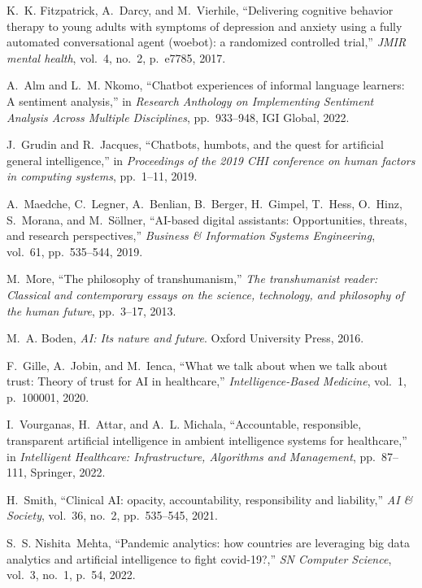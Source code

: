 \documentclass{article}
\begin{document}
\begin{thebibliography}{100}
	K.~K. Fitzpatrick, A.~Darcy, and M.~Vierhile, ``Delivering cognitive behavior
	therapy to young adults with symptoms of depression and anxiety using a fully
	automated conversational agent (woebot): a randomized controlled trial,''
	{\em JMIR mental health}, vol.~4, no.~2, p.~e7785, 2017.
	
	A.~Alm and L.~M. Nkomo, ``Chatbot experiences of informal language learners: A
	sentiment analysis,'' in {\em Research Anthology on Implementing Sentiment
		Analysis Across Multiple Disciplines}, pp.~933--948, IGI Global, 2022.
	
	J.~Grudin and R.~Jacques, ``Chatbots, {h}umbots, and the quest for artificial
	general intelligence,'' in {\em Proceedings of the 2019 CHI conference on
		human factors in computing systems}, pp.~1--11, 2019.
	
	A.~Maedche, C.~Legner, A.~Benlian, B.~Berger, H.~Gimpel, T.~Hess, O.~Hinz,
	S.~Morana, and M.~S{\"o}llner, ``{AI}-based digital assistants:
	Opportunities, threats, and research perspectives,'' {\em Business \&
		Information Systems Engineering}, vol.~61, pp.~535--544, 2019.
	
	M.~More, ``The philosophy of transhumanism,'' {\em The transhumanist reader:
		Classical and contemporary essays on the science, technology, and philosophy
		of the human future}, pp.~3--17, 2013.
	
	M.~A. Boden, {\em AI: Its nature and future}.
	\newblock Oxford University Press, 2016.
	
	F.~Gille, A.~Jobin, and M.~Ienca, ``What we talk about when we talk about
	trust: Theory of trust for {AI} in healthcare,'' {\em Intelligence-Based
		Medicine}, vol.~1, p.~100001, 2020.
	
	I.~Vourganas, H.~Attar, and A.~L. Michala, ``Accountable, responsible,
	transparent artificial intelligence in ambient intelligence systems for
	healthcare,'' in {\em Intelligent Healthcare: Infrastructure, Algorithms and
		Management}, pp.~87--111, Springer, 2022.
	
	H.~Smith, ``Clinical {AI}: opacity, accountability, responsibility and
	liability,'' {\em {AI} \& Society}, vol.~36, no.~2, pp.~535--545, 2021.
	
	S.~S. Nishita~Mehta, ``Pandemic analytics: how countries are leveraging big
	data analytics and artificial intelligence to fight covid-19?,'' {\em SN
		Computer Science}, vol.~3, no.~1, p.~54, 2022.
	

\end{thebibliography}
\end{document}
